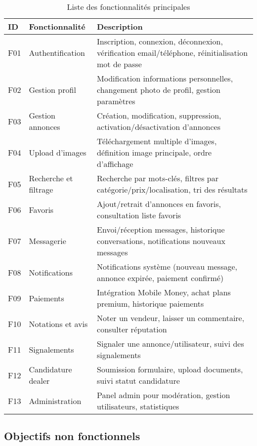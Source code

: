 \documentclass[12pt,a4paper]{report}
\begin{document}
\begin{table}[H]
\centering
\begin{tabular}{|p{1cm}|p{5cm}|p{7cm}|}
\hline
\textbf{ID} & \textbf{Fonctionnalité} & \textbf{Description} \\
\hline
F01 & Authentification & Inscription, connexion, déconnexion, vérification email/téléphone, réinitialisation mot de passe \\
\hline
F02 & Gestion profil & Modification informations personnelles, changement photo de profil, gestion paramètres \\
\hline
F03 & Gestion annonces & Création, modification, suppression, activation/désactivation d'annonces \\
\hline
F04 & Upload d'images & Téléchargement multiple d'images, définition image principale, ordre d'affichage \\
\hline
F05 & Recherche et filtrage & Recherche par mots-clés, filtres par catégorie/prix/localisation, tri des résultats \\
\hline
F06 & Favoris & Ajout/retrait d'annonces en favoris, consultation liste favoris \\
\hline
F07 & Messagerie & Envoi/réception messages, historique conversations, notifications nouveaux messages \\
\hline
F08 & Notifications & Notifications système (nouveau message, annonce expirée, paiement confirmé) \\
\hline
F09 & Paiements & Intégration Mobile Money, achat plans premium, historique paiements \\
\hline
F10 & Notations et avis & Noter un vendeur, laisser un commentaire, consulter réputation \\
\hline
F11 & Signalements & Signaler une annonce/utilisateur, suivi des signalements \\
\hline
F12 & Candidature dealer & Soumission formulaire, upload documents, suivi statut candidature \\
\hline
F13 & Administration & Panel admin pour modération, gestion utilisateurs, statistiques \\
\hline
\end{tabular}
\caption{Liste des fonctionnalités principales}
\end{table}

\subsection{Objectifs non fonctionnels}
\end{document}
